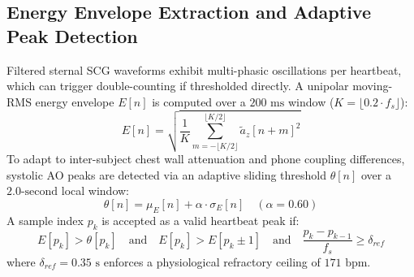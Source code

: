 \subsection{Energy Envelope Extraction and Adaptive Peak Detection}
Filtered sternal SCG waveforms exhibit multi-phasic oscillations per heartbeat, which can trigger double-counting if thresholded directly. A unipolar moving-RMS energy envelope $E[n]$ is computed over a $200\text{ ms}$ window ($K = \lfloor 0.2 \cdot f_s \rfloor$):
\begin{equation}
	E[n] = \sqrt{\frac{1}{K}\sum_{m=-\lfloor K/2 \rfloor}^{\lfloor K/2 \rfloor} \tilde{a}_z[n+m]^2}
\end{equation}
To adapt to inter-subject chest wall attenuation and phone coupling differences, systolic AO peaks are detected via an adaptive sliding threshold $\theta[n]$ over a $2.0\text{-second}$ local window:
\begin{equation}
	\theta[n] = \mu_E[n] + \alpha \cdot \sigma_E[n] \quad (\alpha = 0.60)
\end{equation}
A sample index $p_k$ is accepted as a valid heartbeat peak if:
\begin{equation}
	E[p_k] > \theta[p_k] \quad \text{and} \quad E[p_k] > E[p_k \pm 1] \quad \text{and} \quad \frac{p_k - p_{k-1}}{f_s} \ge \delta_{ref}
\end{equation}
where $\delta_{ref} = 0.35\text{ s}$ enforces a physiological refractory ceiling of $171\text{ bpm}$.

